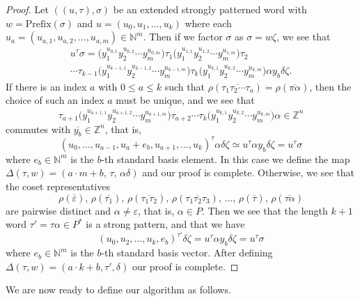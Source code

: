 \begin{proof}
Let $((u,\tau),\sigma)$ be an extended strongly patterned word with $w = \mathrm{Prefix}(\sigma)$ and $u = (u_0, u_1, \ldots,u_k)$ where each $u_{a} = (u_{a,1}, u_{a,2},\ldots,u_{a,m}) \in \mathbb{N}^m$. 
Then if we factor $\sigma$ as $\sigma = w\zeta$, we see that
\begin{multline*}
	u^\tau \sigma
	=
	\Big(
		y_1^{u_{0,1}}
		y_2^{u_{0,2}}
		\cdots
		y_m^{u_{0,m}}
	\Big)
	\tau_1
	\Big(
		y_1^{u_{1,1}}
		y_2^{u_{1,2}}
		\cdots
		y_m^{u_{1,m}}
	\Big)
	\tau_2
	\\
	\cdots
	\tau_{k-1}
	\Big(
		y_1^{u_{k-1,1}}
		y_2^{u_{k-1,2}}
		\cdots
		y_m^{u_{k-1,m}}
	\Big)
	\tau_k
	\Big(
		y_1^{u_{k,1}}
		y_2^{u_{k,2}}
		\cdots
		y_m^{u_{k,m}}
	\Big)
	\alpha y_b \delta \zeta.
\end{multline*}
If there is an index $a$ with $0 \leqslant a \leqslant k$ such that $\rho(\overline{\tau_1 \tau_2 \cdots \tau_a}) = \rho(\overline{\pi \alpha})$, then the choice of such an index $a$ must be unique, and we see that
\[
	\overline{
		\tau_{a+1}
		\Big(
			y_1^{u_{a+1,1}}
			y_2^{u_{a+1,2}}
			\cdots
			y_m^{u_{a+1,m}}
		\Big)
		\tau_{a+2}
		\cdots
		\tau_k
		\Big(
			y_1^{u_{k,1}}
			y_2^{u_{k,2}}
			\cdots
			y_m^{u_{k,m}}
		\Big)
		\alpha
	} \in \mathbb{Z}^n
\]
commutes with $\overline{y_b} \in \mathbb{Z}^n$, that is,
\[
	{(u_0,\ldots,u_{a-1},u_a+e_b,u_{a+1},\ldots,u_k)}^\tau
	\alpha \delta \zeta
	\simeq
	u^\tau \alpha y_b \delta \zeta
	=
	u^\tau \sigma
\]
where $e_b \in \mathbb{N}^m$ is the $b$-th standard basis element.
In this case we define the map $\Delta(\tau,w) = (a\cdot m+b, \, \tau,\, \alpha\delta)$ and our proof is complete.
Otherwise, we see that the coset representatives
\[
	\rho(\overline{\varepsilon}),\,
	\rho(\overline{\tau_1}),\,
	\rho(\overline{\tau_1\tau_2}),\,
	\rho(\overline{\tau_1\tau_2\tau_3}),\,
	\ldots,\,
	\rho(\overline{\tau}),\,
	\rho(\overline{\tau\alpha})
\]
are pairwise distinct and $\alpha \neq \varepsilon$, that is, $\alpha \in P$.
Then we see that the length $k+1$ word $\tau' = \tau \alpha \in P^*$ is a strong pattern, and that we have
\[
	(u_0,u_2,\ldots,u_k,e_b)^{\tau'} \delta \zeta = u^\tau \alpha y_b \delta\zeta = u^\tau\sigma
\]
where $e_b \in \mathbb{N}^m$ is the $b$-th standard basis vector.
After defining $\Delta(\tau,w) = (a\cdot k+b, \tau', \delta)$ our proof is complete.
\end{proof}

We are now ready to define our algorithm as follows.

